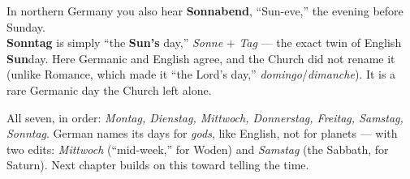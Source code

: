 \begin{culture}
In northern Germany you also hear \textbf{Sonnabend}, ``Sun-eve,'' the evening
before Sunday.\\[3pt]
\textbf{Sonntag} is simply ``the \textbf{Sun's} day,'' \emph{Sonne} $+$
\emph{Tag} --- the exact twin of English \textbf{Sun}day. Here Germanic and
English agree, and the Church did not rename it (unlike Romance, which made it
``the Lord's day,'' \emph{domingo}/\emph{dimanche}). It is a rare Germanic day
the Church left alone.
\end{culture}

All seven, in order: \emph{Montag, Dienstag, Mittwoch, Donnerstag, Freitag,
Samstag, Sonntag}. German names its days for \emph{gods}, like English, not for
planets --- with two edits: \emph{Mittwoch} (``mid-week,'' for Woden) and
\emph{Samstag} (the Sabbath, for Saturn). Next chapter builds on this toward
telling the time.
